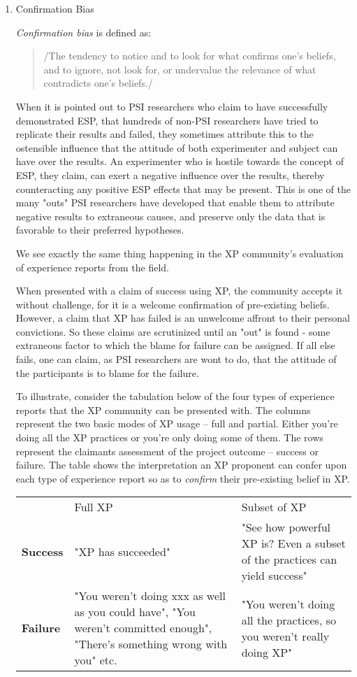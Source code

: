 \documentclass{article}
\begin{document}
\begin{enumerate}
\item Confirmation Bias
\label{sec:orgheadline217}

\emph{Confirmation bias} is defined as:

\begin{quote}
/The tendency to notice and to look for what confirms one's beliefs,
and to ignore, not look for, or undervalue the relevance of what
contradicts one's beliefs./
\end{quote}

When it is pointed out to PSI researchers who claim to have successfully
demonstrated ESP, that hundreds of non-PSI researchers have tried to
replicate their results and failed, they sometimes attribute this to the
ostensible influence that the attitude of both experimenter and subject
can have over the results. An experimenter who is hostile towards the
concept of ESP, they claim, can exert a negative influence over the
results, thereby counteracting any positive ESP effects that may be
present. This is one of the many "outs" PSI researchers have developed
that enable them to attribute negative results to extraneous causes, and
preserve only the data that is favorable to their preferred hypotheses.

We see exactly the same thing happening in the XP community's evaluation
of experience reports from the field.

When presented with a claim of success using XP, the community accepts
it without challenge, for it is a welcome confirmation of pre-existing
beliefs. However, a claim that XP has failed is an unwelcome affront to
their personal convictions. So these claims are scrutinized until an
"out" is found - some extraneous factor to which the blame for failure
can be assigned. If all else fails, one can claim, as PSI researchers
are wont to do, that the attitude of the participants is to blame for
the failure.

To illustrate, consider the tabulation below of the four types of
experience reports that the XP community can be presented with. The
columns represent the two basic modes of XP usage -- full and partial.
Either you're doing all the XP practices or you're only doing some of
them. The rows represent the claimants assessment of the project outcome
-- success or failure. The table shows the interpretation an XP
proponent can confer upon each type of experience report so as to
\emph{confirm} their pre-existing belief in XP.

\begin{center}
\begin{tabular}{lll}
 & Full XP & Subset of XP\\
\textbf{Success} & "XP has succeeded" & "See how powerful XP is? Even a subset of the practices can yield success"\\
\textbf{Failure} & "You weren't doing xxx as well as you could have",  "You weren't committed enough", "There's something wrong with you" etc. & "You weren't doing all the practices, so you weren't really doing XP"\\
\end{tabular}
\end{center}


\end{enumerate}
\end{document}
